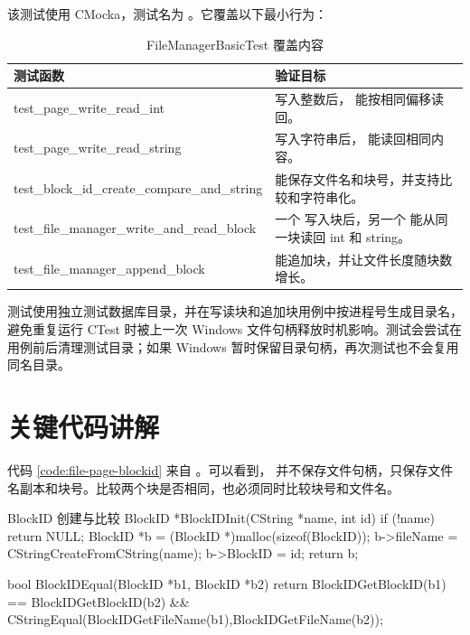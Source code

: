 该测试使用 CMocka，测试名为 。它覆盖以下最小行为：

\begin{table}[htbp]
  \centering
  \caption{FileManagerBasicTest 覆盖内容}
  \label{tab:file-page-tests}
  \begin{tabularx}{\textwidth}{>{\ttfamily}l Y}
    \toprule
    测试函数 & 验证目标 \\
    \midrule
    test\_page\_write\_read\_int &  写入整数后， 能按相同偏移读回。\\
    test\_page\_write\_read\_string &  写入字符串后， 能读回相同内容。\\
    test\_block\_id\_create\_compare\_and\_string &  能保存文件名和块号，并支持比较和字符串化。\\
    test\_file\_manager\_write\_and\_read\_block & 一个  写入块后，另一个  能从同一块读回 int 和 string。\\
    test\_file\_manager\_append\_block &  能追加块，并让文件长度随块数增长。\\
    \bottomrule
  \end{tabularx}
\end{table}

测试使用独立测试数据库目录，并在写读块和追加块用例中按进程号生成目录名，避免重复运行 CTest 时被上一次 Windows 文件句柄释放时机影响。测试会尝试在用例前后清理测试目录；如果 Windows 暂时保留目录句柄，再次测试也不会复用同名目录。

\section{关键代码讲解}
\label{sec:file-page-code}

代码 \ref{code:file-page-blockid} 来自 。可以看到， 并不保存文件句柄，只保存文件名副本和块号。比较两个块是否相同，也必须同时比较块号和文件名。

\begin{dbcode}{BlockID 创建与比较}
BlockID *BlockIDInit(CString *name, int id){
    if (!name)
        return NULL;
    BlockID *b = (BlockID *)malloc(sizeof(BlockID));
    b->fileName = CStringCreateFromCString(name);
    b->BlockID = id;
    return b;
}

bool BlockIDEqual(BlockID *b1, BlockID *b2){
    return BlockIDGetBlockID(b1) == BlockIDGetBlockID(b2)
    && CStringEqual(BlockIDGetFileName(b1),BlockIDGetFileName(b2));
}
\end{dbcode}
\label{code:file-page-blockid}

